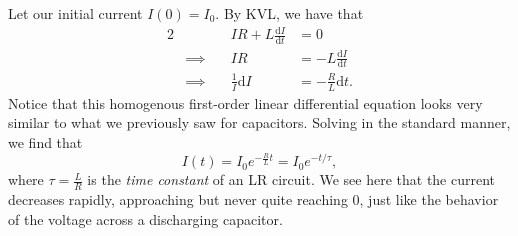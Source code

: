 \documentclass[letterpaper]{article}
\theoremstyle{remark}
\newcommand{\dt}{\mathrm{d}t}
\newcommand{\dI}{\mathrm{d}I}
\newcommand{\eqn}[1]{\begin{alignat*}{2}#1\end{alignat*}}
\newcommand*{\thus}{&\implies\quad&}
\begin{document}
Let our initial current $I(0) = I_0$. By KVL, we have that
\eqn{
    && IR + L \frac{\dI}{\dt} &= 0 \\
    \thus IR &= -L\frac{\dI}{\dt} \\
    \thus \frac{1}{I} \dI &= -\frac{R}{L} \dt.
}
Notice that this homogenous first-order linear differential equation looks very similar to what we previously saw for capacitors. Solving in the standard manner, we find that
\[
    I(t) = I_0 e^{-\frac{R}{L}t} = I_0 e^{-t / \tau},
\]
where $\tau = \frac{L}{R}$ is the \emph{time constant} of an LR circuit. We see here that the current decreases rapidly, approaching but never quite reaching $0$, just like the behavior of the voltage across a discharging capacitor.
\end{document}
